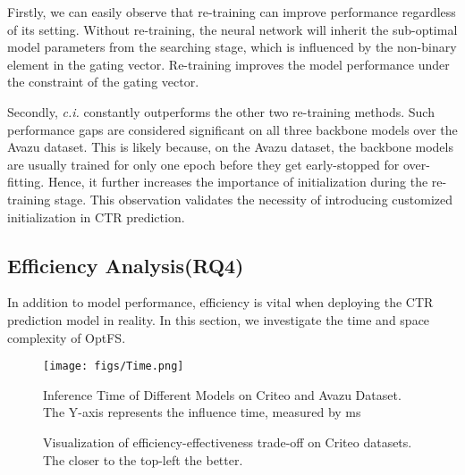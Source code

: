 \documentclass[sigconf]{acmart}
\begin{document}
Firstly, we can easily observe that re-training can improve performance regardless of its setting. Without re-training, the neural network will inherit the sub-optimal model parameters from the searching stage, which is influenced by the non-binary element in the gating vector. Re-training improves the model performance under the constraint of the gating vector.

Secondly, \textit{c.i.} constantly outperforms the other two re-training methods. Such performance gaps are considered significant on all three backbone models over the Avazu dataset. This is likely because, on the Avazu dataset, the backbone models are usually trained for only one epoch before they get early-stopped for over-fitting. Hence, it further increases the importance of initialization during the re-training stage. This observation validates the necessity of introducing customized initialization in CTR prediction.

\subsection{Efficiency Analysis(RQ4)}

In addition to model performance, efficiency is vital when deploying the CTR prediction model in reality. In this section, we investigate the time and space complexity of OptFS.

\begin{figure}[!htbp]
    \centering
    \texttt{[image: figs/Time.png]}
    \vspace{-5pt}
    \caption{Inference Time of Different Models on Criteo and Avazu Dataset. The Y-axis represents the influence time, measured by ms}
    \vspace{-5pt}
    \label{fig:Time}
\end{figure}

\begin{figure}[!htbp]
    \centering
    \vspace{-5pt}
    \caption{Visualization of efficiency-effectiveness trade-off on Criteo datasets. The closer to the top-left the better.}
    \vspace{-10pt}
    \label{fig:Param-AUC}
\end{figure}
\end{document}
